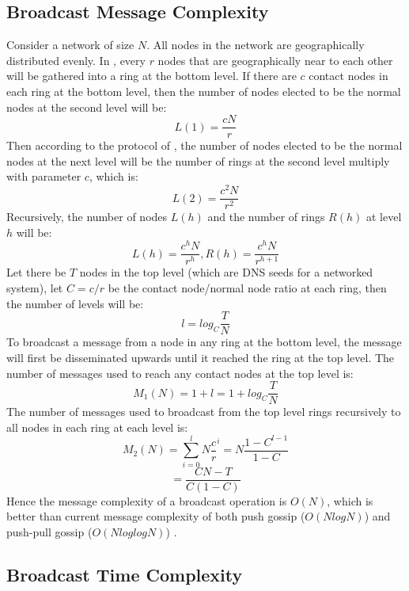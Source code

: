 \subsection{Broadcast Message Complexity}

Consider a network of size $N$. All nodes in the network are geographically distributed evenly. 
In \xxx, every $r$ nodes that are geographically near to each other will be gathered into a ring at the bottom level. 
If there are $c$ contact nodes in each ring at the bottom level, then the number of nodes elected to be the normal nodes at the second level will be: $$L(1) = \frac{cN}{r}$$ 
Then according to the protocol of \xxx, the number of nodes elected to be the normal nodes at the next level will be the number of rings at the second level multiply with parameter $c$, which is: $$L(2) = \frac{c^2N}{r^2}$$ 
Recursively, the number of nodes $L(h)$ and the number of rings $R(h)$ at level $h$ will be: $$L(h) = \frac{c^hN}{r^h}, R(h)=\frac{c^hN}{r^{h+1}}$$ 
Let there be $T$ nodes in the top level (which are DNS seeds for a networked system), let $C = c/r$ be the contact node/normal node ratio at each ring, then the number of levels will be: $$l = log_{C}{\frac{T}{N}}$$
To broadcast a message from a node in any ring at the bottom level, the message will first be disseminated upwards until it reached the ring at the top level. The number of messages used to reach any contact nodes at the top level is: $$M_1(N)=1+l=1+log_{C}{\frac{T}{N}}$$
The number of messages used to broadcast from the top level rings recursively to all nodes in each ring at each level is: $$M_2(N)=\sum_{i=0}^{l} N\frac{c}{r}^i=N\frac{1-C^{l-1}}{1-C}$$
$$=\frac{CN-T}{C(1-C)}$$ Hence the message complexity of a broadcast operation is $O(N)$, which is better than current message complexity of both push gossip ($O(NlogN)$) and push-pull gossip ($O(NloglogN)$) \cite{jelasity2011gossip}.

\subsection{Broadcast Time Complexity}

